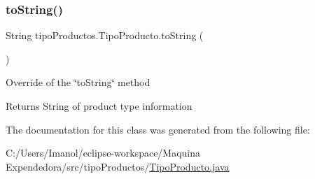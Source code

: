 \subsubsection{\texorpdfstring{to\+String()}{toString()}}
{\footnotesize\ttfamily String tipo\+Productos.\+Tipo\+Producto.\+to\+String (\begin{DoxyParamCaption}{ }\end{DoxyParamCaption})}

Override of the \char`\"{}to\+String\char`\"{} method \begin{DoxyReturn}{Returns}
String of product type information 
\end{DoxyReturn}


The documentation for this class was generated from the following file\+:\begin{DoxyCompactItemize}
\item 
C\+:/\+Users/\+Imanol/eclipse-\/workspace/\+Maquina Expendedora/src/tipo\+Productos/\mbox{\hyperlink{_tipo_producto_8java}{Tipo\+Producto.\+java}}\end{DoxyCompactItemize}
